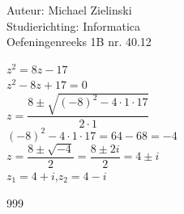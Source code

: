 \documentclass[a4paper]{article}
\begin{document}
\noindent \large Auteur: Michael Zielinski \\
\noindent \large Studierichting: Informatica \\
\noindent \large Oefeningenreeks 1B nr. 40.12 \\

\medskip
\normalsize

$z^2 = 8z - 17$ \\
  
$z^2 - 8z + 17 = 0$ \\
  
$z = \dfrac{8 \pm \sqrt{(-8)^2 - 4 \cdot 1 \cdot 17}}{2 \cdot 1}$ \\
  
$(-8)^2 - 4 \cdot 1 \cdot 17 = 64 - 68 = -4$ \\
  
$z = \dfrac{8 \pm \sqrt{-4}}{2} = \dfrac{8 \pm 2i}{2} = 4 \pm i$ \\
  
$z_1 = 4 + i$,\quad $z_2 = 4 - i$ \\
  

\begin{thebibliography}{999}
\end{thebibliography}
\end{document}
